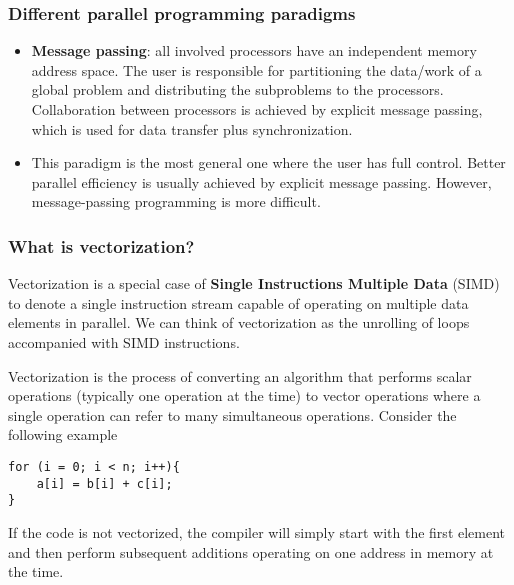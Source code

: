 \documentclass{beamer}
\begin{document}
\begin{frame}
\frametitle{Different parallel programming paradigms}

\begin{block}{}

\begin{itemize}
\item \textbf{Message passing}:  all involved processors have an independent memory address space. The user is responsible for  partitioning the data/work of a global problem and distributing the  subproblems to the processors. Collaboration between processors is achieved by explicit message passing, which is used for data transfer plus synchronization.

\item This paradigm is the most general one where the user has full control. Better parallel efficiency is usually achieved by explicit message passing. However, message-passing programming is more difficult.
\end{itemize}

\noindent
\end{block}
\end{frame}

\begin{frame}
\frametitle{What is vectorization?}

Vectorization is a special
case of \textbf{Single Instructions Multiple Data} (SIMD) to denote a single
instruction stream capable of operating on multiple data elements in
parallel. 
We can think of vectorization as the unrolling of loops accompanied with SIMD instructions.

Vectorization is the process of converting an algorithm that performs scalar operations
(typically one operation at the time) to vector operations where a single operation can refer to many simultaneous operations.
Consider the following example




\begin{verbatim}
for (i = 0; i < n; i++){
    a[i] = b[i] + c[i];
}

\end{verbatim}

If the code is not vectorized, the compiler will simply start with the first element and 
then perform subsequent additions operating on one address in memory at the time.
\end{frame}
\end{document}
